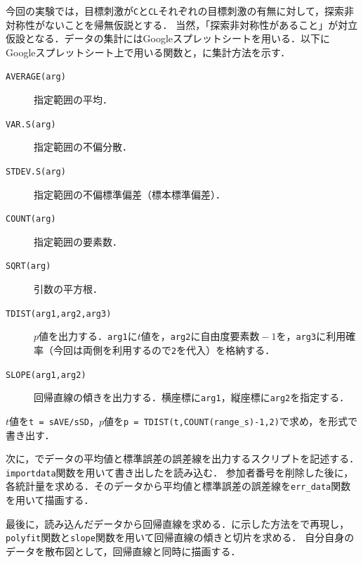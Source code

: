 今回の実験では，目標刺激が\texttt{C}と\texttt{CL}それぞれの目標刺激の有無に対して，探索非対称性がないことを帰無仮説とする．
当然，「探索非対称性があること」が対立仮設となる．データの集計にはGoogleスプレットシートを用いる．以下にGoogleスプレットシート上で用いる関数と，に集計方法を示す．
\begin{multicols}{2}
    \begin{description}
        \item[\texttt{AVERAGE(arg)}] 指定範囲の平均．
        \item[\texttt{VAR.S(arg)}] 指定範囲の不偏分散．
        \item[\texttt{STDEV.S(arg)}] 指定範囲の不偏標準偏差（標本標準偏差）．
        \item[\texttt{COUNT(arg)}] 指定範囲の要素数．
        \item[\texttt{SQRT(arg)}] 引数の平方根．
        \item[\texttt{TDIST(arg1,arg2,arg3)}] \(p\)値を出力する．\texttt{arg1}に\(t\)値を，\texttt{arg2}に自由度\(\textrm{要素数}-1\)を，\texttt{arg3}に利用確率（今回は両側を利用するので\texttt{2}を代入）を格納する．
        \item[\texttt{SLOPE(arg1,arg2)}] 回帰直線の傾きを出力する．横座標に\texttt{arg1}，縦座標に\texttt{arg2}を指定する．
    \end{description}
\end{multicols}

\(t\)値を\texttt{t = sAVE/sSD}，\(p\)値を\texttt{p = TDIST(t,COUNT(range\_s)-1,2)}で求め，を\csv 形式で書き出す．\par
次に，\matlab でデータの平均値と標準誤差の誤差線を出力するスクリプトを記述する．\texttt{importdata}関数を用いて書き出した\csv を読み込む．
参加者番号を削除した後に，各統計量を求める．そのデータから平均値と標準誤差の誤差線を\texttt{err\_data}関数を用いて描画する．\par
最後に，読み込んだデータから回帰直線を求める．に示した方法を\matlab で再現し，\texttt{polyfit}関数と\texttt{slope}関数を用いて回帰直線の傾きと切片を求める．
自分自身のデータを散布図として，回帰直線と同時に描画する．
